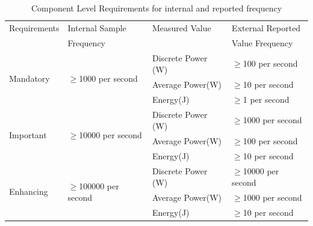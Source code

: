 \begin{table}[htbp]
\caption{Component Level Requirements for internal and reported frequency}
\label{tab:comlevel}
\centering
\begin{tabular}{ |l|l|l|l| }
\hline
Requirements & Internal Sample & Measured Value & External Reported \\
 & Frequency & & Value Frequency \\
\hline

\multirow{3}{*}{Mandatory} & \multirow{3}{*}{\mbox{$ \ge $}1000 per second} &
Discrete Power (W) & \mbox{$ \ge $}100 per second \\  
 & & Average Power(W) & \mbox{$ \ge $}10 per second \\  
 & & Energy(J) & \mbox{$ \ge $}1 per second \\  \hline

\multirow{3}{*}{Important} & \multirow{3}{*}{\mbox{$ \ge $}10000 per second} &   
Discrete Power (W) & \mbox{$ \ge $}1000 per second \\  
 & & Average Power(W) & \mbox{$ \ge $}100 per second \\  
 & & Energy(J) & \mbox{$ \ge $}10 per second \\  \hline

\multirow{3}{*}{Enhancing} & \multirow{3}{*}{\mbox{$ \ge $}100000 per second} & 
Discrete Power (W) & \mbox{$ \ge $}10000 per second \\  
 & & Average Power(W) & \mbox{$ \ge $}1000 per second \\  
 & & Energy(J) & \mbox{$ \ge $}10 per second \\  \hline

\end{tabular}
\end{table}


